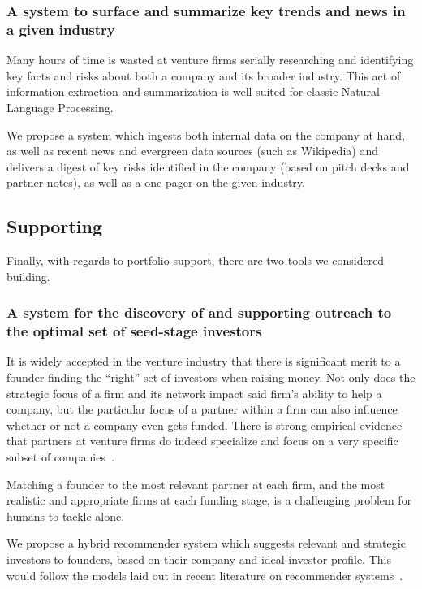 \subsubsection{A system to surface and summarize key trends and news in a given industry}

Many hours of time is wasted at venture firms serially researching and identifying key facts and risks about both a company and its broader industry. This act of information extraction and summarization is well-suited for classic Natural Language Processing.

We propose a system which ingests both internal data on the company at hand, as well as recent news and evergreen data sources (such as Wikipedia) and delivers a digest of key risks identified in the company (based on pitch decks and partner notes), as well as a one-pager on the given industry.

\subsection{Supporting}

Finally, with regards to portfolio support, there are two tools we considered building.

\subsubsection{A system for the discovery of and supporting outreach to the optimal set of seed-stage investors}

It is widely accepted in the venture industry that there is significant merit to a founder finding the ``right'' set of investors when raising money. Not only does the strategic focus of a firm and its network impact said firm's ability to help a company, but the particular focus of a partner within a firm can also influence whether or not a company even gets funded. There is strong empirical evidence that partners at venture firms do indeed specialize and focus on a very specific subset of companies~\cite{Stone:2013:EST:2541167.2507882}.

Matching a founder to the most relevant partner at each firm, and the most realistic and appropriate firms at each funding stage, is a challenging problem for humans to tackle alone.

We propose a hybrid recommender system which suggests relevant and strategic investors to founders, based on their company and ideal investor profile. This would follow the models laid out in recent literature on recommender systems~\cite{Burke2002}.

